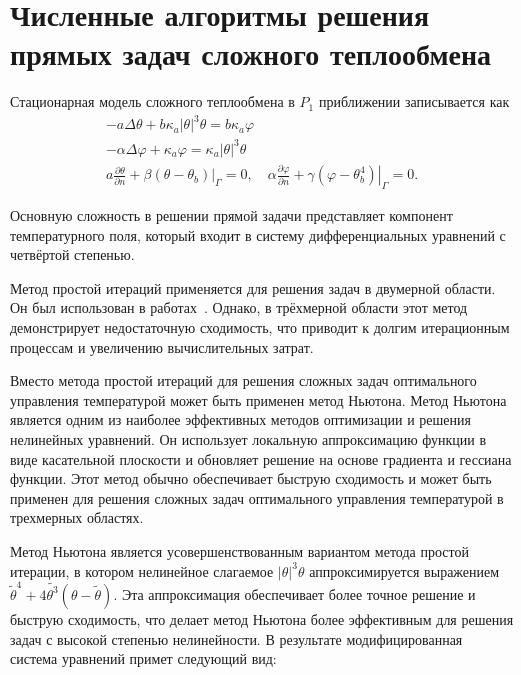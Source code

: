 \section{Численные алгоритмы решения прямых задач сложного теплообмена}
\label{sec:ch4/sec1}
Стационарная модель сложного теплообмена
в $P_1$ приближении записывается как
\[
    \begin{gathered}
        -a \Delta \theta+b \kappa_{a}| \theta|^{3} \theta =
        b \kappa_{a} \varphi \\
        -\alpha \Delta \varphi+\kappa_{a} \varphi =
        \kappa_{a}|\theta|^{3} \theta \\
        a \frac{\partial \theta}{\partial n}
        +\left.\beta\left(\theta-\theta_{b}\right)\right|_{\Gamma}=0,
        \quad \alpha \frac{\partial \varphi}{\partial n}
        +\left.\gamma\left(\varphi-\theta_{b}^{4}\right)\right|_{\Gamma}=0.
    \end{gathered}
\]

Основную сложность в решении прямой задачи представляет компонент
температурного поля, который входит в систему
дифференциальных уравнений с четвёртой степенью.

Метод простой итераций применяется для решения задач в двумерной области.
Он был использован в работах~\cite{Kovtanyuk2015,astrakhantseva2014numerical}.
Однако, в трёхмерной области этот метод демонстрирует недостаточную сходимость,
что приводит к долгим итерационным процессам и увеличению вычислительных затрат.

Вместо метода простой итераций для решения сложных задач оптимального управления
температурой может быть применен метод Ньютона.
Метод Ньютона является одним из наиболее эффективных методов оптимизации
и решения нелинейных уравнений.
Он использует локальную аппроксимацию функции в виде касательной плоскости
и обновляет решение на основе градиента и гессиана функции.
Этот метод обычно обеспечивает быструю сходимость и может быть
применен для решения сложных задач оптимального
управления температурой в трехмерных областях.


Метод Ньютона является усовершенствованным вариантом метода простой итерации,
в котором нелинейное слагаемое $|\theta|^3 \theta$ аппроксимируется
выражением $\widetilde{\theta}^4+4 \widetilde{\theta^3}(\theta-\widetilde{\theta})$.
Эта аппроксимация обеспечивает более точное решение и быструю сходимость,
что делает метод Ньютона более эффективным для
решения задач с высокой степенью нелинейности.
В результате модифицированная система уравнений примет следующий вид:

